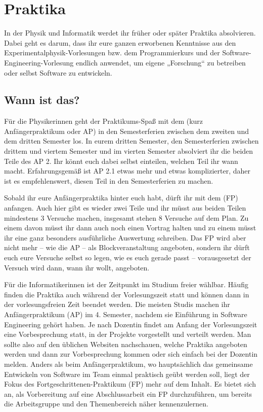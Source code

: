 \section{Praktika}

In der Physik und Informatik werdet ihr früher oder später Praktika absolvieren. Dabei geht es darum, dass ihr eure ganzen erworbenen Kenntnisse aus den Experimentalphysik-Vorlesungen bzw. dem Programmierkurs und der Software-Engineering-Vorlesung endlich anwendet, um eigene „Forschung“ zu betreiben oder selbst Software zu entwickeln.

\subsection{Wann ist das?}

Für die Physikerinnen geht der Praktikums-Spaß mit dem  (kurz Anfängerpraktikum oder \gls{AP}) in den Semesterferien zwischen dem zweiten und dem dritten Semester los. In eurem dritten Semester, den Semesterferien zwischen drittem und viertem Semester und im vierten Semester absolviert ihr die beiden Teile des AP 2. Ihr könnt euch dabei selbst einteilen, welchen Teil ihr wann macht. Erfahrungsgemäß ist AP 2.1 etwas mehr und etwas komplizierter, daher ist es empfehlenswert, diesen Teil in den Semesterferien zu machen.

Sobald ihr eure Anfängerpraktika hinter euch habt, dürft ihr mit dem  (\gls{FP}) anfangen. Auch hier gibt es wieder zwei Teile und ihr müsst aus beiden Teilen mindestens 3 Versuche machen, insgesamt stehen 8 Versuche auf dem Plan. Zu einem davon müsst ihr dann auch noch einen Vortrag halten und zu einem müsst ihr eine ganz besonders ausführliche Auswertung schreiben. Das \gls{FP} wird aber nicht mehr -- wie die \gls{AP} -- als Blockveranstaltung angeboten, sondern ihr dürft euch eure Versuche selbst so legen, wie es euch gerade passt -- vorausgesetzt der Versuch wird dann, wann ihr wollt, angeboten.

Für die Informatikerinnen ist der Zeitpunkt im Studium freier wählbar. Häufig finden die Praktika auch während der Vorlesungszeit statt und können dann in der vorlesungsfreien Zeit beendet werden. Die meisten Studis machen ihr Anfängerpraktikum (\gls{AP}) im 4. Semester, nachdem sie Einführung in Software Engineering gehört haben. Je nach Dozentin findet am Anfang der Vorlesungszeit eine Vorbesprechung statt, in der Projekte vorgestellt und verteilt werden. Man sollte also auf den üblichen Websiten nachschauen, welche Praktika angeboten werden und dann zur Vorbesprechung kommen oder sich einfach bei der Dozentin melden.
Anders als beim Anfängerpraktikum, wo hauptsächlich das gemeinsame Entwickeln von Software im Team einmal praktisch geübt werden soll, liegt der Fokus des Fortgeschrittenen-Praktikum (\gls{FP}) mehr auf dem Inhalt. Es bietet sich an, als Vorbereitung auf eine Abschlussarbeit ein FP durchzuführen, um bereits die Arbeitsgruppe und den Themenbereich näher kennenzulernen.


